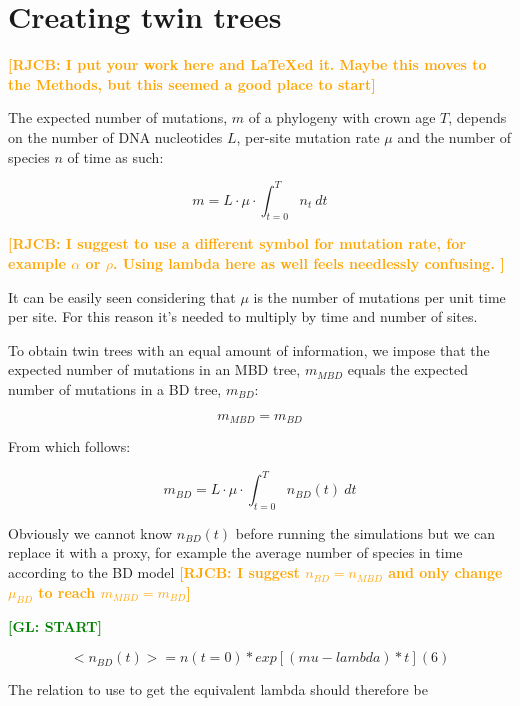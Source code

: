 \documentclass{article}
\newcommand*\richel[1]{\textcolor{orange}{\textbf{[RJCB: #1]}}}
\newcommand*\gio[1]{\textcolor{green}{\textbf{[GL: #1]}}}
\begin{document}
\appendix

\section{Creating twin trees}

\richel{I put your work here and LaTeXed it. Maybe this moves
to the Methods, but this seemed a good place to start}

The expected number of mutations, $m$ of a phylogeny 
with crown age $T$,
depends on the number of DNA nucleotides $L$,
per-site mutation rate $\mu$ and the number of species $n$
of time as such:

\begin{equation}
m = L \cdot \mu \cdot \int_{t=0}^{T} n_t\ dt
\end{equation}

\richel{I suggest to use a different symbol for mutation rate, 
  for example $\alpha$ or $\rho$. Using lambda here as well feels
  needlessly confusing.
}

It can be easily seen considering that $\mu$ is the number of mutations
per unit time per site. For this reason it's needed to multiply by
time and number of sites.

To obtain twin trees with an equal amount of information, we impose
that the expected number of mutations in an MBD tree, $m_{MBD}$ equals
the expected number of mutations in a BD tree, $m_{BD}$:

\begin{equation}
m_{MBD} = m_{BD}
\end{equation}

From which follows:

\begin{equation}
m_{BD} = L \cdot \mu \cdot \int_{t=0}^{T} n_{BD}(t)\ dt
\end{equation}

Obviously we cannot know $n_{BD}(t)$ before running the simulations but
we can replace it with a proxy, for example the average number of
species in time according to the BD model
\richel{I suggest $n_{BD} = n_{MBD}$ and only 
change $\mu_{BD}$ to reach $m_{MBD} = m_{BD}$}

\gio{START}

$$
<n_{BD}(t)> = n(t=0) * exp[(mu - lambda) * t] (6)
$$

The relation to use to get the equivalent lambda should therefore be
\end{document}

